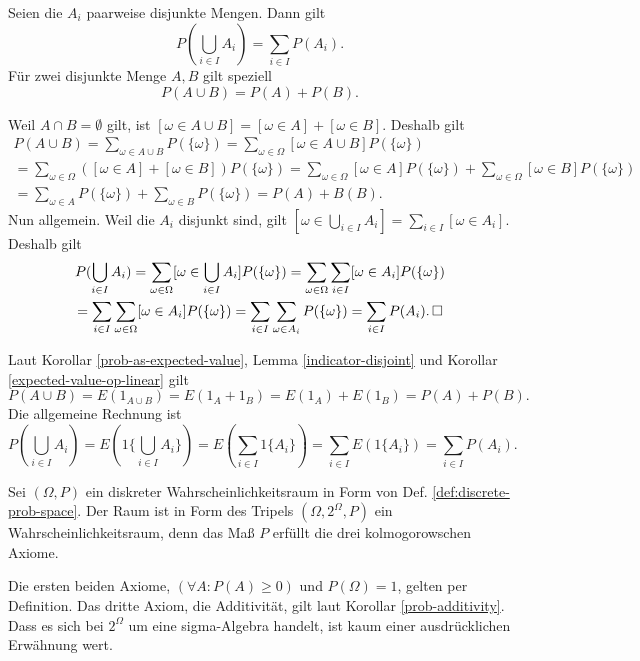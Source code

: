 \newpage
\begin{Korollar}%
\label{prob-additivity}\newlinefirst
Seien die $A_i$ paarweise disjunkte Mengen. Dann gilt
\[P(\bigcup_{i\in I} A_i) = \sum_{i\in I} P(A_i).\]
Für zwei disjunkte Menge $A,B$ gilt speziell
\[P(A\cup B) = P(A) + P(B).\]
\end{Korollar}

\begin{Beweis}[Beweis 1]
Weil $A\cap B=\emptyset$ gilt, ist $[\omega\in A\cup B]
= [\omega\in A]+[\omega\in B]$. Deshalb gilt
\begin{gather*}
P(A\cup B) = \sum_{\omega\in A\cup B} P(\{\omega\})
= \sum_{\omega\in\Omega} [\omega\in A\cup B] P(\{\omega\})\\
= \sum_{\omega\in\Omega} ([\omega\in A]+[\omega\in B]) P(\{\omega\})
= \sum_{\omega\in\Omega} [\omega\in A]P(\{\omega\})
+ \sum_{\omega\in\Omega} [\omega\in B]P(\{\omega\})\\
= \sum_{\omega\in A} P(\{\omega\}) + \sum_{\omega\in B} P(\{\omega\})
= P(A)+B(B).
\end{gather*}
Nun allgemein. Weil die $A_i$ disjunkt sind, gilt
$[\omega\in\bigcup_{i\in I} A_i] = \sum_{i\in I} [\omega\in A_i]$. Deshalb gilt
\begin{gather*}
P(\bigcup_{i\in I} A_i)
= \sum_{\omega\in\Omega}[\omega\in\bigcup_{i\in I} A_i]P(\{\omega\})
= \sum_{\omega\in\Omega}\sum_{i\in I}[\omega\in A_i]P(\{\omega\})\\
= \sum_{i\in I}\sum_{\omega\in\Omega}[\omega\in A_i]P(\{\omega\})
= \sum_{i\in I}\sum_{\omega\in A_i}P(\{\omega\})
= \sum_{i\in I}P(A_i).\,\square
\end{gather*}
\end{Beweis}
\begin{Beweis}[Beweis 2]
Laut Korollar \ref{prob-as-expected-value},
Lemma \ref{indicator-disjoint}
und Korollar \ref{expected-value-op-linear} gilt
\[P(A\cup B) = E(1_{A\cup B}) = E(1_A+1_B) = E(1_A) + E(1_B)
= P(A) + P(B).\]
Die allgemeine Rechnung ist
\[P(\bigcup_{i\in I} A_i) = E(1\{\bigcup_{i\in I} A_i\})
= E(\sum_{i\in I} 1\{A_i\})
= \sum_{i\in I} E(1\{A_i\}) = \sum_{i\in I} P(A_i).\]
\end{Beweis}

\begin{Korollar}
Sei $(\Omega,P)$ ein diskreter Wahrscheinlichkeitsraum in Form von Def.
\ref{def:discrete-prob-space}. Der Raum ist in Form des Tripels
$(\Omega,2^\Omega,P)$ ein Wahrscheinlichkeitsraum, denn das Maß
$P$ erfüllt die drei kolmogorowschen Axiome.
\end{Korollar}
\begin{Beweis}
Die ersten beiden Axiome, $(\forall A\colon P(A)\ge 0)$ und
$P(\Omega)=1$, gelten per Definition. Das dritte Axiom, die Additivität,
gilt laut Korollar \ref{prob-additivity}. Dass es sich bei $2^\Omega$
um eine sigma-Algebra handelt, ist kaum einer ausdrücklichen
Erwähnung wert.\,\qedsymbol
\end{Beweis}

